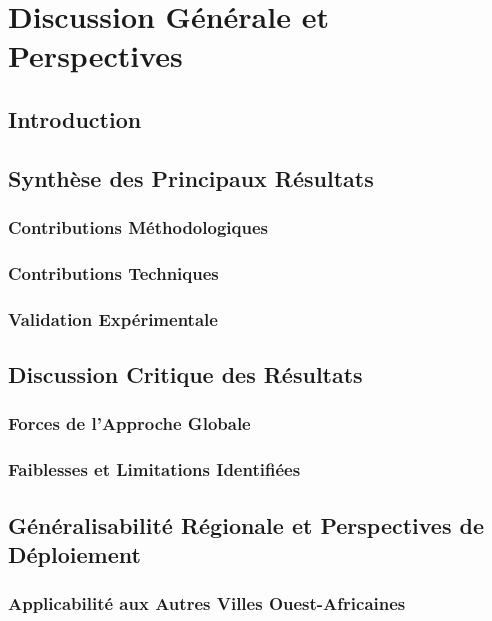 \section{Discussion Générale et Perspectives}
\label{sec:discussion_perspectives}

\subsection{Introduction}

\subsection{Synthèse des Principaux Résultats}
\subsubsection{Contributions Méthodologiques}

\subsubsection{Contributions Techniques}

\subsubsection{Validation Expérimentale}

\subsection{Discussion Critique des Résultats}
\subsubsection{Forces de l'Approche Globale}

\subsubsection{Faiblesses et Limitations Identifiées}

\subsection{Généralisabilité Régionale et Perspectives de Déploiement}
\subsubsection{Applicabilité aux Autres Villes Ouest-Africaines}

